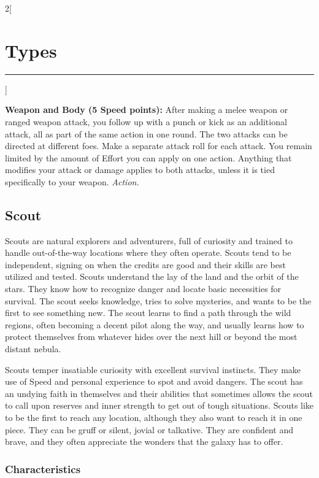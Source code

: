 \documentclass[a4paper,10pt,final]{book}
\newcommand{\HRule}{\rule{\linewidth}{0.5mm}} %
\newcommand{\newSection}[1]{\section*{#1} \addcontentsline{toc}{section}{#1} \label{sec:#1} \HRule}
\newcommand{\itemAbility}[2]{\textcolor{25gray}{\textbullet\textbf{ #1:}} {#2}\par}
\newcommand{\action}{\textit{ Action.}}
\newenvironment{docsection}[1]
{
  \begin{multicols*}{2}[\newSection{#1}]
}
{
  \end{multicols*}
  \newpage
}
\begin{document}
\begin{docsection}{Types}
\itemAbility{Weapon and Body (5 Speed points)}{After making a melee weapon or ranged weapon attack, you follow up with a punch or kick as an additional attack, all as part of the same action in one round. The two attacks can be directed at different foes. Make a separate attack roll for each attack. You remain limited by the amount of Effort you can apply on one action. Anything that modifies your attack or damage applies to both attacks, unless it is tied specifically to your weapon.\action}

\newpage



\subsection*{Scout} %
\label{sub:scout}

Scouts are natural explorers and adventurers, full of curiosity and trained to handle out-of-the-way locations where they often operate. Scouts tend to be independent, signing on when the credits are good and their skills are best utilized and tested. Scouts understand the lay of the land and the orbit of the stars. They know how to recognize danger and locate basic necessities for survival. The scout seeks knowledge, tries to solve mysteries, and wants to be the first to see something new. The scout learns to find a path through the wild regions, often becoming a decent pilot along the way, and usually learns how to protect themselves from whatever hides over the next hill or beyond the most distant nebula.

Scouts temper insatiable curiosity with excellent survival instincts. They make use of Speed and personal experience to spot and avoid dangers. The scout has an undying faith in themselves and their abilities that sometimes allows the scout to call upon reserves and inner strength to get out of tough situations. Scouts like to be the first to reach any location, although they also want to reach it in one piece. They can be gruff or silent, jovial or talkative. They are confident and brave, and they often appreciate the wonders that the galaxy has to offer.

\subsubsection*{Characteristics}
\label{subsub:scoutCharacteristics}


\end{docsection}
\end{document}
